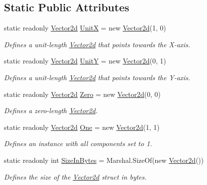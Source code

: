 \subsection*{Static Public Attributes}
\begin{DoxyCompactItemize}
\item 
static readonly \hyperlink{struct_open_t_k_1_1_vector2d}{Vector2d} \hyperlink{struct_open_t_k_1_1_vector2d_aef5769e047c770dcc537be20baf7fdab}{Unit\-X} = new \hyperlink{struct_open_t_k_1_1_vector2d}{Vector2d}(1, 0)
\begin{DoxyCompactList}\small\item\em Defines a unit-\/length \hyperlink{struct_open_t_k_1_1_vector2d}{Vector2d} that points towards the X-\/axis. \end{DoxyCompactList}\item 
static readonly \hyperlink{struct_open_t_k_1_1_vector2d}{Vector2d} \hyperlink{struct_open_t_k_1_1_vector2d_a3bcd3b007dba58a896c0016ae27c21d2}{Unit\-Y} = new \hyperlink{struct_open_t_k_1_1_vector2d}{Vector2d}(0, 1)
\begin{DoxyCompactList}\small\item\em Defines a unit-\/length \hyperlink{struct_open_t_k_1_1_vector2d}{Vector2d} that points towards the Y-\/axis. \end{DoxyCompactList}\item 
static readonly \hyperlink{struct_open_t_k_1_1_vector2d}{Vector2d} \hyperlink{struct_open_t_k_1_1_vector2d_a5b5b62970c7d37767d4d665068714638}{Zero} = new \hyperlink{struct_open_t_k_1_1_vector2d}{Vector2d}(0, 0)
\begin{DoxyCompactList}\small\item\em Defines a zero-\/length \hyperlink{struct_open_t_k_1_1_vector2d}{Vector2d}. \end{DoxyCompactList}\item 
static readonly \hyperlink{struct_open_t_k_1_1_vector2d}{Vector2d} \hyperlink{struct_open_t_k_1_1_vector2d_adb9c74ec43c54427fee2f74cb06e1995}{One} = new \hyperlink{struct_open_t_k_1_1_vector2d}{Vector2d}(1, 1)
\begin{DoxyCompactList}\small\item\em Defines an instance with all components set to 1. \end{DoxyCompactList}\item 
static readonly int \hyperlink{struct_open_t_k_1_1_vector2d_aaea85487e5855f3e18e3820ddb005f7b}{Size\-In\-Bytes} = Marshal.\-Size\-Of(new \hyperlink{struct_open_t_k_1_1_vector2d}{Vector2d}())
\begin{DoxyCompactList}\small\item\em Defines the size of the \hyperlink{struct_open_t_k_1_1_vector2d}{Vector2d} struct in bytes. \end{DoxyCompactList}\end{DoxyCompactItemize}
